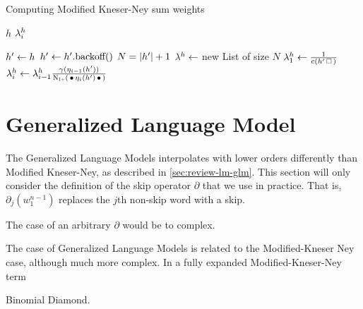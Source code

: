 \begin{algorithm}
  \caption{Computing Modified Kneser-Ney sum weights}
  \label{alg:weightedsum-mkn}
  \begin{algorithmic}[1]
    \Require $h$
    \Ensure $\lambda_i^h$

    \State $h^\prime \gets h$
      \State $h^\prime \gets h^\prime\text{.backoff()}$
    \EndWhile
    \State $N = \left|h^\prime\right| + 1$
    \State $\lambda^h \gets$ new List of size $N$
    \State $\SumWeight_1^h \gets \frac{1}{\Count(\SeenHistory \Skp)}$
      \State $\SumWeight_i^h \gets \SumWeight_{i-1}^h \frac{\gamma(\History_{i-1}(\SeenHistory))}{\ContCountIp(\WSkp \History_i(\SeenHistory) \WSkp)}$
    \EndFor
  \end{algorithmic}
\end{algorithm}

\section{Generalized Language Model}

The Generalized Language Models interpolates with lower orders differently
than Modified Kneser-Ney, as described in \cref{sec:review-lm-glm}.
This section will only consider the definition of the skip operator
$\partial$ that we use in practice.
That is, $\partial_j(w_1^{n-1})$ replaces the $j$th non-skip word with a skip.
\begin{draft}
The  case of an arbitrary $\partial$ would be to complex.
\end{draft}

The case of Generalized Language Models is related to the Modified-Kneser Ney
case, although much more complex.
In a fully expanded Modified-Kneser-Ney term

\begin{draft}
Binomial Diamond.
\end{draft}

